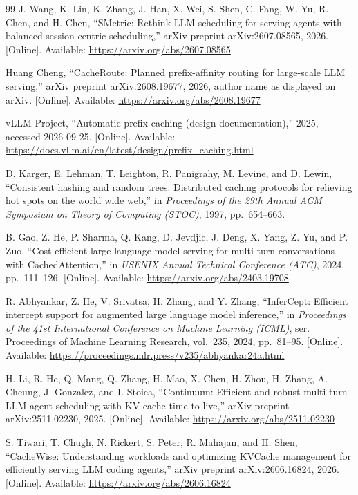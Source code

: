 \documentclass[conference]{IEEEtran}
\begin{document}
\begin{thebibliography}{99}
 J. Wang, K. Lin, K. Zhang, J. Han, X. Wei, S. Shen, C. Fang, W. Yu, R. Chen, and H. Chen, ``SMetric: Rethink LLM scheduling for serving agents with balanced session-centric scheduling,'' arXiv preprint arXiv:2607.08565, 2026. [Online]. Available: \url{https://arxiv.org/abs/2607.08565}

 Huang Cheng, ``CacheRoute: Planned prefix-affinity routing for large-scale LLM serving,'' arXiv preprint arXiv:2608.19677, 2026, author name as displayed on arXiv. [Online]. Available: \url{https://arxiv.org/abs/2608.19677}

 vLLM Project, ``Automatic prefix caching (design documentation),'' 2025, accessed 2026-09-25. [Online]. Available: \url{https://docs.vllm.ai/en/latest/design/prefix_caching.html}

 D. Karger, E. Lehman, T. Leighton, R. Panigrahy, M. Levine, and D. Lewin, ``Consistent hashing and random trees: Distributed caching protocols for relieving hot spots on the world wide web,'' in \emph{Proceedings of the 29th Annual ACM Symposium on Theory of Computing (STOC)}, 1997, pp.~654--663.

 B. Gao, Z. He, P. Sharma, Q. Kang, D. Jevdjic, J. Deng, X. Yang, Z. Yu, and P. Zuo, ``Cost-efficient large language model serving for multi-turn conversations with CachedAttention,'' in \emph{USENIX Annual Technical Conference (ATC)}, 2024, pp.~111--126. [Online]. Available: \url{https://arxiv.org/abs/2403.19708}

 R. Abhyankar, Z. He, V. Srivatsa, H. Zhang, and Y. Zhang, ``InferCept: Efficient intercept support for augmented large language model inference,'' in \emph{Proceedings of the 41st International Conference on Machine Learning (ICML)}, ser. Proceedings of Machine Learning Research, vol.~235, 2024, pp.~81--95. [Online]. Available: \url{https://proceedings.mlr.press/v235/abhyankar24a.html}

 H. Li, R. He, Q. Mang, Q. Zhang, H. Mao, X. Chen, H. Zhou, H. Zhang, A. Cheung, J. Gonzalez, and I. Stoica, ``Continuum: Efficient and robust multi-turn LLM agent scheduling with KV cache time-to-live,'' arXiv preprint arXiv:2511.02230, 2025. [Online]. Available: \url{https://arxiv.org/abs/2511.02230}

 S. Tiwari, T. Chugh, N. Rickert, S. Peter, R. Mahajan, and H. Shen, ``CacheWise: Understanding workloads and optimizing KVCache management for efficiently serving LLM coding agents,'' arXiv preprint arXiv:2606.16824, 2026. [Online]. Available: \url{https://arxiv.org/abs/2606.16824}


\end{thebibliography}
\end{document}

